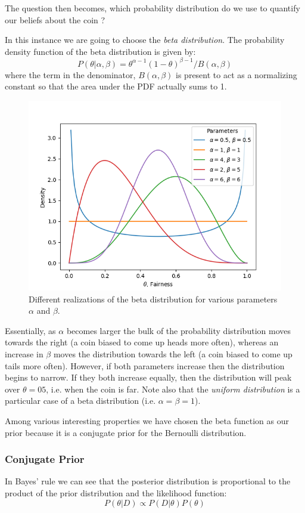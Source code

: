 The question then becomes, which probability distribution do we use to quantify our beliefs about the coin ?

In this instance we are going to choose the \emph{beta distribution}. The probability density function of the beta distribution is given by:
\begin{equation}
	P(\theta|\alpha,\beta)=\theta^{\alpha -1}(1-\theta)^{\beta-1}/B(\alpha,\beta)
\end{equation}
where the term in the denominator, $B(\alpha,\beta)$ is present to act as a normalizing constant so that the area under the PDF actually sums to 1.

\begin{figure}[htb]
  \centering
  \includegraphics[width=.7\textwidth]{figures/beta_distro}
  \caption{Different realizations of the beta distribution for various parameters $\alpha$ and $\beta$.}
  \label{fig:beta_distro}
\end{figure}

Essentially, as $\alpha$ becomes larger the bulk of the probability distribution moves towards the right (a coin biased to come up heads more often), whereas an increase in $\beta$ moves the distribution towards the left (a coin biased to come up tails more often).
However, if both parameters increase then the distribution begins to narrow. If they both increase equally, then the distribution will peak over $\theta=05$, i.e. when the coin is far. Note also that the \emph{uniform distribution} is a particular case of a beta distribution (i.e. $\alpha = \beta = 1$).

Among various interesting properties we have chosen the beta function as our prior because it is a conjugate prior for the Bernoulli distribution.

\subsubsection{Conjugate Prior}
In Bayes' rule we can see that the posterior distribution is proportional to the product of the prior distribution and the likelihood function:
\begin{equation}
  P(\theta|D)\propto P(D|\theta)P(\theta)
\end{equation}

